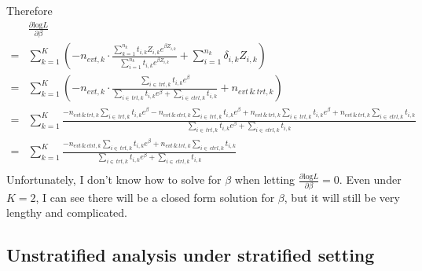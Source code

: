 \documentclass[a4paper,12pt]{article}
\begin{document}
Therefore
\[
  \begin{aligned}
    &\frac{\partial \mathrm{log}L}{\partial\beta}    \\
    =& \sum\limits_{k = 1}^{K}\left(
    - n_{evt, k}\cdot
    \frac{
    \sum\limits_{k = 1}^{n_k}t_{i, k}Z_{i, k}e^{\beta Z_{i, k}}
    }{
    \sum\limits_{i = 1}^{n_k}t_{i, k}e^{\beta Z_{i, k}}
    }
    + \sum\limits_{i = 1}^{n_k}\delta_{i, k}Z_{i, k}
       \right)    \\
    =& \sum\limits_{k = 1}^{K}\left(
       - n_{evt, k}\cdot
       \frac{
       \sum\limits_{i\in\,trt, k}t_{i, k}e^\beta
       }{
       \sum\limits_{i\in\,trt, k}t_{i, k}e^\beta + \sum\limits_{i\in\,ctrl, k}t_{i, k}
       }
       + n_{evt\,\&\,trt, k}
       \right)    \\
    =& \sum\limits_{k = 1}^K
       \frac{
       - n_{evt\,\&\,trt, k}\sum\limits_{i\in\,trt, k}t_{i, k}e^\beta
       - n_{evt\,\&\,ctrl, k}\sum\limits_{i\in\,trt, k}t_{i, k}e^\beta
       +
       n_{evt\,\&\,trt, k}\sum\limits_{i\in\,trt, k}t_{i, k}e^\beta
       + n_{evt\,\&\,trt, k}\sum\limits_{i\in\,ctrl, k}t_{i, k}
       }{
       \sum\limits_{i\in\,trt, k}t_{i, k}e^\beta + \sum\limits_{i\in\,ctrl, k}t_{i, k}
       }    \\
    =& \sum\limits_{k = 1}^K
       \frac{
       - n_{evt\,\&\,ctrl, k}\sum\limits_{i\in\,trt, k}t_{i, k}e^\beta
       + n_{evt\,\&\,trt, k}\sum\limits_{i\in\,ctrl, k}t_{i, k}
       }{
       \sum\limits_{i\in\,trt, k}t_{i, k}e^\beta + \sum\limits_{i\in\,ctrl, k}t_{i, k}
       }    \\
  \end{aligned}
\]
Unfortunately, I don't know how to solve for $\beta$ when letting $\frac{\partial\mathrm{log}L}{\partial\beta} = 0$. Even under $K = 2$, I can see there will be a closed form solution for $\beta$, but it will still be very lengthy and complicated.

\subsection{Unstratified analysis under stratified setting}
\label{sec:unstr-analys-under}
\end{document}

